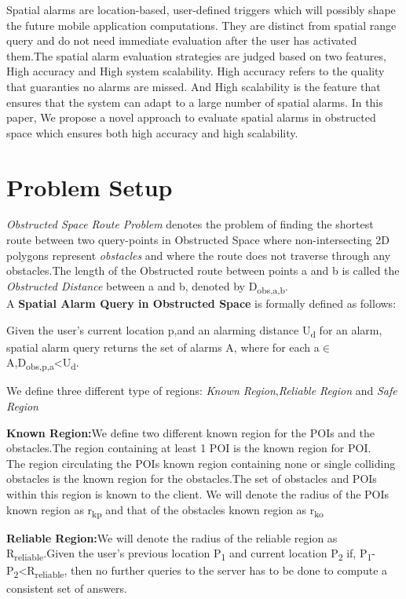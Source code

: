 \documentclass{sig-alternate}
\begin{document}
Spatial alarms are location-based, user-defined triggers which will possibly shape the future mobile application computations. They are distinct from spatial range query and do not need immediate evaluation after the user has activated them.The spatial alarm evaluation strategies are judged based on two features, High accuracy and High system scalability. High accuracy refers to the quality that guaranties no alarms are missed. And High scalability is the feature that ensures that the system can adapt to a large number of spatial alarms.
In this paper, We propose a novel approach to evaluate spatial alarms in obstructed space which ensures both high accuracy and high scalability.
\section{Problem Setup}
\textit{Obstructed Space Route Problem} denotes the problem of finding the shortest route between two query-points  in Obstructed Space where non-intersecting 2D polygons represent \textit{obstacles} and where the route does not traverse through any obstacles.The length of the Obstructed route between points a and b is called the \textit{Obstructed Distance} between a and b, denoted by D\textsubscript{obs,a,b}.\\
A \textbf{Spatial Alarm Query in Obstructed Space} is formally defined as follows:
\begin{defn}
Given the user's current location p,and an alarming distance U\textsubscript{d} for an alarm, spatial alarm query returns the set of alarms A, where for each a$\in$ A,D\textsubscript{obs,p,a}<U\textsubscript{d}. 
\end{defn}
We define three different type of regions: \textit{Known Region},\textit{Reliable Region} and \textit{Safe Region}

\begin{defn} \textbf{Known Region:}We define two different known region for the POIs and the obstacles.The region containing at least 1 POI is the known region for POI.\\
The region circulating the POIs known region containing none or single colliding obstacles is the known region for the obstacles.The set of obstacles and POIs within this region is known to the client. 
We will denote the radius of the POIs known region as r\textsubscript{kp} and that of the obstacles known region as r\textsubscript{ko}
\end{defn}

\begin{defn}
\textbf{Reliable Region:}We will denote the radius of the reliable region as R\textsubscript{reliable}.Given the user's previous location P\textsubscript{1} and current location P\textsubscript{2} if, P\textsubscript{1}-P\textsubscript{2}<R\textsubscript{reliable}, then no further queries to the server has to be done to compute a consistent set of answers.
\end{defn}
\end{document}
